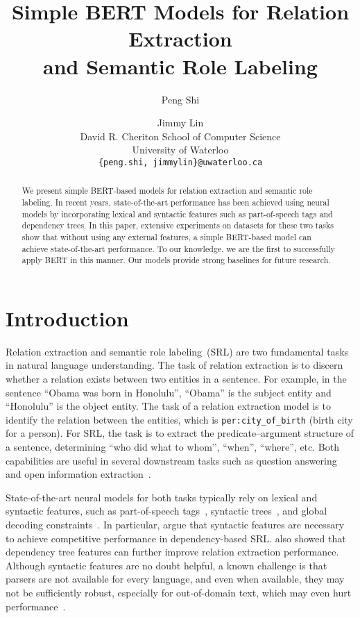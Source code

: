 \documentclass[11pt,a4paper]{article}
\title{Simple BERT Models for Relation Extraction\\ and Semantic Role Labeling}
\author{Peng Shi \and Jimmy Lin \vspace{0.1cm}\\
  David R. Cheriton School of Computer Science \\
  University of Waterloo\\
  \texttt{\{peng.shi, jimmylin\}@uwaterloo.ca} \\}
\date{}
\begin{document}
\maketitle
\begin{abstract}
We present simple BERT-based models for relation extraction and semantic role labeling.
In recent years, state-of-the-art performance has been achieved using neural models by incorporating lexical and syntactic features such as part-of-speech tags and dependency trees.
In this paper, extensive experiments on datasets for these two tasks show that without using any external features, a simple BERT-based model can achieve state-of-the-art performance.
To our knowledge, we are the first to successfully apply BERT in this manner.
Our models provide strong baselines for future research.
\end{abstract}


\section{Introduction}

Relation extraction and semantic role labeling~(SRL) are two fundamental tasks in natural language understanding.
The task of relation extraction is to discern whether a relation exists between two entities in a sentence. 
For example, in the sentence ``Obama was born in Honolulu'', ``Obama'' is the subject entity and ``Honolulu'' is the object entity. 
The task of a relation extraction model is to identify the relation between the entities, which is \texttt{\small per:city\_of\_birth} (birth city for a person). 
For SRL, the task is to extract the predicate--argument structure of a sentence, determining ``who did what to whom'', ``when'', ``where'', etc. 
Both capabilities are useful in several downstream tasks such as question answering~\cite{shen2007using} and open information extraction~\cite{fader2011identifying}.

State-of-the-art neural models for both tasks typically rely on lexical and syntactic features, such as part-of-speech tags~\cite{marcheggiani2017simple}, syntactic trees~\cite{roth2016neural, zhang2018graph, li2018unified}, and global decoding constraints~\cite{li2019dependency}. 
In particular, \citet{roth2016neural} argue that syntactic features are necessary to achieve competitive performance in dependency-based SRL. 
\citet{zhang2018graph} also showed that dependency tree features can further improve relation extraction performance.
Although syntactic features are no doubt helpful, a known challenge is that parsers are not available for every language, and even when available, they may not be sufficiently robust, especially for out-of-domain text, which may even hurt performance~\cite{he2017deep}.
\end{document}
